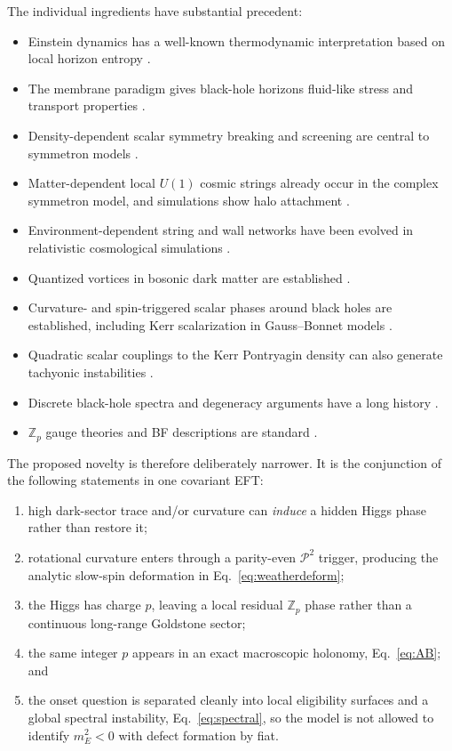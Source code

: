 \documentclass[11pt]{article}
\newcommand{\Pontryagin}{\mathcal P}
\begin{document}
The individual ingredients have substantial precedent:
\begin{itemize}[leftmargin=1.5em]
    \item Einstein dynamics has a well-known thermodynamic interpretation based on local horizon entropy \citep{Jacobson1995,ElingGuedensJacobson2006}.
    \item The membrane paradigm gives black-hole horizons fluid-like stress and transport properties \citep{ParikhWilczek1998}.
    \item Density-dependent scalar symmetry breaking and screening are central to symmetron models \citep{HinterbichlerKhoury2010}.
    \item Matter-dependent local $U(1)$ cosmic strings already occur in the complex symmetron model, and simulations show halo attachment \citep{NezhadsafaviPogosian2025}.
    \item Environment-dependent string and wall networks have been evolved in relativistic cosmological simulations \citep{ChristiansenAdamekKunz2026}.
    \item Quantized vortices in bosonic dark matter are established \citep{KainLing2010,BraxValageas2025}.
    \item Curvature- and spin-triggered scalar phases around black holes are established, including Kerr scalarization in Gauss--Bonnet models \citep{DonevaYazadjiev2018,HerdeiroEtAl2021,DonevaCollodelYazadjiev2022,LaiEtAl2026}.
    \item Quadratic scalar couplings to the Kerr Pontryagin density can also generate tachyonic instabilities \citep{GaoHuangLiu2019}.
    \item Discrete black-hole spectra and degeneracy arguments have a long history \citep{BekensteinMukhanov1995}.
    \item $\mathbb Z_p$ gauge theories and BF descriptions are standard \citep{KapustinSeiberg2014,GaiottoEtAl2015}.
\end{itemize}

The proposed novelty is therefore deliberately narrower.  It is the conjunction of the following statements in one covariant EFT:
\begin{enumerate}[leftmargin=1.7em]
    \item high dark-sector trace and/or curvature can \emph{induce} a hidden Higgs phase rather than restore it;
    \item rotational curvature enters through a parity-even $\Pontryagin^2$ trigger, producing the analytic slow-spin deformation in Eq.~\eqref{eq:weatherdeform};
    \item the Higgs has charge $p$, leaving a local residual $\mathbb Z_p$ phase rather than a continuous long-range Goldstone sector;
    \item the same integer $p$ appears in an exact macroscopic holonomy, Eq.~\eqref{eq:AB}; and
    \item the onset question is separated cleanly into local eligibility surfaces and a global spectral instability, Eq.~\eqref{eq:spectral}, so the model is not allowed to identify $m_E^2<0$ with defect formation by fiat.
\end{enumerate}
\end{document}
